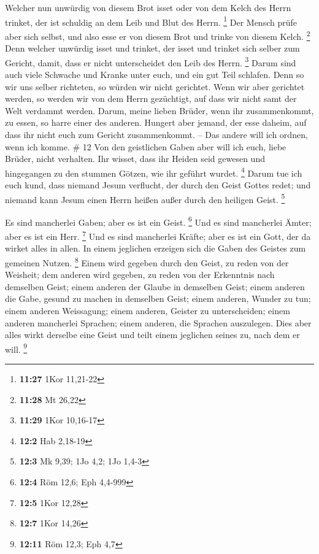  Welcher nun unwürdig von diesem Brot isset oder von dem
Kelch des Herrn trinket, der ist schuldig an dem Leib und Blut des
Herrn. \footnote{\textbf{11:27} 1Kor 11,21-22}  Der
Mensch prüfe aber sich selbst, und also esse er von diesem Brot und
trinke von diesem Kelch. \footnote{\textbf{11:28} Mt 26,22}
 Denn welcher unwürdig isset und trinket, der isset und
trinket sich selber zum Gericht, damit, dass er nicht unterscheidet den
Leib des Herrn. \footnote{\textbf{11:29} 1Kor 10,16-17} 
Darum sind auch viele Schwache und Kranke unter euch, und ein gut Teil
schlafen.  Denn so wir uns selber richteten, so würden
wir nicht gerichtet.  Wenn wir aber gerichtet werden, so
werden wir von dem Herrn gezüchtigt, auf dass wir nicht samt der Welt
verdammt werden.  Darum, meine lieben Brüder, wenn ihr
zusammenkommt, zu essen, so harre einer des anderen. 
Hungert aber jemand, der esse daheim, auf dass ihr nicht euch zum
Gericht zusammenkommt. -- Das andere will ich ordnen, wenn ich komme. \#
12  Von den geistlichen Gaben aber will ich euch, liebe
Brüder, nicht verhalten.  Ihr wisset, dass ihr Heiden seid
gewesen und hingegangen zu den stummen Götzen, wie ihr geführt wurdet.
\footnote{\textbf{12:2} Hab 2,18-19}  Darum tue ich euch
kund, dass niemand Jesum verflucht, der durch den Geist Gottes redet;
und niemand kann Jesum einen Herrn heißen außer durch den heiligen
Geist. \footnote{\textbf{12:3} Mk 9,39; 1Jo 4,2; 1Jo 1,4-3}

 Es sind mancherlei Gaben; aber es ist ein Geist.
\footnote{\textbf{12:4} Röm 12,6; Eph 4,4-999}  Und es
sind mancherlei Ämter; aber es ist ein Herr. \footnote{\textbf{12:5}
  1Kor 12,28}  Und es sind mancherlei Kräfte; aber es ist
ein Gott, der da wirket alles in allen.  In einem
jeglichen erzeigen sich die Gaben des Geistes zum gemeinen Nutzen.
\footnote{\textbf{12:7} 1Kor 14,26}  Einem wird gegeben
durch den Geist, zu reden von der Weisheit; dem anderen wird gegeben, zu
reden von der Erkenntnis nach demselben Geist;  einem
anderen der Glaube in demselben Geist; einem anderen die Gabe, gesund zu
machen in demselben Geist;  einem anderen, Wunder zu tun;
einem anderen Weissagung; einem anderen, Geister zu unterscheiden; einem
anderen mancherlei Sprachen; einem anderen, die Sprachen auszulegen.
 Dies aber alles wirkt derselbe eine Geist und teilt
einem jeglichen seines zu, nach dem er will. \footnote{\textbf{12:11}
  Röm 12,3; Eph 4,7}

